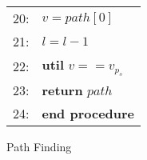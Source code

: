\documentclass{sig-alternate-05-2015}
\begin{document}
\begin{figure*}
\begin{tabular}{rl}
20:&\hspace{20pt}     $v = path[0]$ \\
21:&\hspace{20pt}     $l = l - 1$ \\
22:&\hspace{10pt} \textbf{util} $v == v_{p_s}$ \\
23:&\hspace{10pt} \textbf{return} $path$ \\
24:&\textbf{end procedure} \\
\hline
\end{tabular}
\caption{Path Finding}
\label{fig:path}
\end{figure*}





\end{document}
